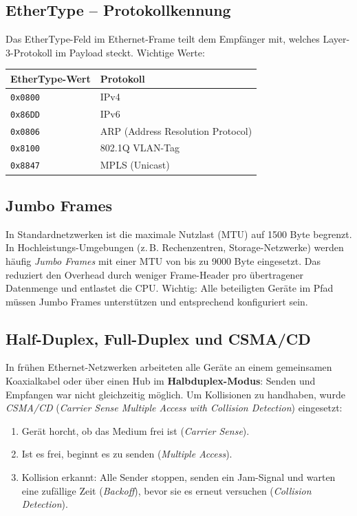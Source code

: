 \documentclass[11pt, oneside, numbers=nönddot]{scrbook}
\begin{document}
\subsection{EtherType -- Protokollkennung}
Das EtherType-Feld im Ethernet-Frame teilt dem Empfänger mit, welches Layer-3-Protokoll im Payload steckt. Wichtige Werte:

\begin{longtable}{|l|l|}
\hline
\textbf{EtherType-Wert} & \textbf{Protokoll} \\
\hline
\texttt{0x0800} & IPv4 \\
\hline
\texttt{0x86DD} & IPv6 \\
\hline
\texttt{0x0806} & ARP (Address Resolution Protocol) \\
\hline
\texttt{0x8100} & 802.1Q VLAN-Tag \\
\hline
\texttt{0x8847} & MPLS (Unicast) \\
\hline
\end{longtable}

\subsection{Jumbo Frames}
In Standardnetzwerken ist die maximale Nutzlast (MTU) auf 1500 Byte begrenzt. In Hochleistungs-Umgebungen (z.\,B. Rechenzentren, Storage-Netzwerke) werden häufig \textit{Jumbo Frames} mit einer MTU von bis zu 9000 Byte eingesetzt. Das reduziert den Overhead durch weniger Frame-Header pro übertragener Datenmenge und entlastet die CPU. Wichtig: Alle beteiligten Geräte im Pfad müssen Jumbo Frames unterstützen und entsprechend konfiguriert sein.

\subsection{Half-Duplex, Full-Duplex und CSMA/CD}
In frühen Ethernet-Netzwerken arbeiteten alle Geräte an einem gemeinsamen Koaxialkabel oder über einen Hub im \textbf{Halbduplex-Modus}: Senden und Empfangen war nicht gleichzeitig möglich. Um Kollisionen zu handhaben, wurde \textit{CSMA/CD} (\textit{Carrier Sense Multiple Access with Collision Detection}) eingesetzt:

\begin{enumerate}
\item Gerät horcht, ob das Medium frei ist (\textit{Carrier Sense}).
\item Ist es frei, beginnt es zu senden (\textit{Multiple Access}).
\item Kollision erkannt: Alle Sender stoppen, senden ein Jam-Signal und warten eine zufällige Zeit (\textit{Backoff}), bevor sie es erneut versuchen (\textit{Collision Detection}).
\end{enumerate}
\end{document}
